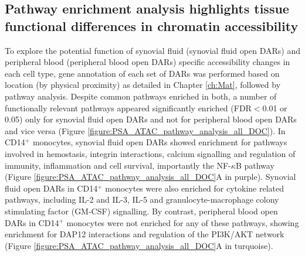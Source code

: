 \subsection{Pathway enrichment analysis highlights tissue functional differences in chromatin accessibility}

To explore the potential function of synovial fluid (synovial fluid open DARs) and peripheral blood (peripheral blood open DARs) specific accessibility changes in each cell type, gene annotation of each set of DARs was performed based on location (by physical proximity) as detailed in Chapter \ref{ch:Mat}, followed by pathway analysis. Despite common pathways enriched in both, a number of functionally relevant pathways appeared  significantly enriched (FDR$<$0.01 or 0.05) only for synovial fluid open DARs and not for peripheral blood open DARs and vice versa (Figure \ref{figure:PSA_ATAC_pathway_analysis_all_DOC}).
In CD14$^+$ monocytes, synovial fluid open DARs showed enrichment for pathways involved in hemostasis, integrin interactions, calcium signalling and regulation of immunity, inflammation and cell survival, importantly the NF-$\kappa$B pathway (Figure \ref{figure:PSA_ATAC_pathway_analysis_all_DOC}A in purple). Synovial fluid open DARs in CD14$^+$ monocytes were also enriched for cytokine related pathways, including IL-2 and IL-3, IL-5 and granulocyte-macrophage colony stimulating factor (GM-CSF) signalling. By contrast, peripheral blood open DARs in CD14$^+$ monocytes were not enriched for any of these pathways, showing enrichment for DAP12 interactions and regulation of the PI3K/AKT network (Figure \ref{figure:PSA_ATAC_pathway_analysis_all_DOC}A in turquoise).

